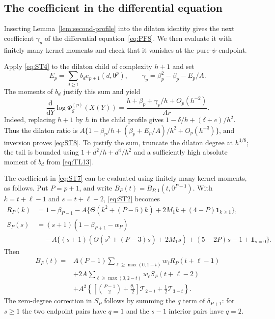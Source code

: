 \subsection{The coefficient in the differential equation}\label{app:transport-coefficient}

Inserting Lemma~\ref{lem:second-profile} into the dilaton identity gives
the next coefficient $\gamma_p$ of the differential equation~\eqref{eq:PF8}.
We then evaluate it with finitely many kernel moments and check that it
vanishes at the pure-$\psi$ endpoint.

Apply \eqref{eq:ST4} to the dilaton child of complexity $h+1$ and set
\begin{equation}
 E_p=\sum_{d\ge1}b_d e_{p+1}(d,0^p),\qquad
 \gamma_p=\beta_p^2-\beta_p-E_p/A.
 \label{eq:ST7}
\end{equation}
The moments of $b_d$ justify this sum and yield
\begin{equation}
 \frac{\mathrm{d}}{\mathrm{d}Y}\log\Phi_g^{(p)}(X(Y))
 =\frac{h+\beta_p+\gamma_p/h+O_p(h^{-2})}{Ar}.
 \label{eq:ST8}
\end{equation}
Indeed, replacing $h+1$ by $h$ in the child profile gives
$1-\delta/h+(\delta+e)/h^2$.
Thus the dilaton ratio is
$A\{1-\beta_p/h+(\beta_p+E_p/A)/h^2+O_p(h^{-3})\}$,
and inversion proves \eqref{eq:ST8}. To justify the sum, truncate the
dilaton degree at $h^{1/8}$; the tail is bounded using
$1+d^2/h+d^4/h^2$ and a sufficiently high absolute moment of $b_d$
from \eqref{eq:TL13}.

The coefficient in \eqref{eq:ST7} can be evaluated using finitely many
kernel moments, as follows.
Put $P=p+1$, and write $B_P(t)=B_{P,1}(t,0^{P-1})$. With
$k=t+\ell-1$ and $s=t+\ell-2$, \eqref{eq:ST2} becomes
\[
\begin{split}
 R_P(k)&=1-\beta_{P-1}
       -A\{\Theta(k^2+(P-5)k)+2M_1k+(4-P)\mathbf1_{k\ge1}\},\\
 S_P(s)&=(s+1)(1-\beta_{P+1}-\alpha_P)\\
 &\quad-A\{(s+1)(\Theta(s^2+(P-3)s)+2M_1s)
                   +(5-2P)s-1+\mathbf1_{s=0}\}.
\end{split}
\]
Then
\begin{equation}
\begin{split}
 B_P(t)={}&A(P-1)\sum_{\ell\ge\max(0,1-t)}w_\ell R_P(t+\ell-1)\\
 &+2A\sum_{\ell\ge\max(0,2-t)}w_\ell S_P(t+\ell-2)\\
 &+A^2\left\{\left[\binom{P-1}2+\frac{\theta_1}2\right]
                     \mathcal T_{2-t}+\frac12\mathcal T_{3-t}\right\}.
\end{split}
 \label{eq:ST9}
\end{equation}
The zero-degree correction in $S_P$ follows by summing the
$q$ term of $\delta_{P+1}$: for $s\ge1$ the two endpoint pairs have
$q=1$ and the $s-1$ interior pairs have $q=2$.

